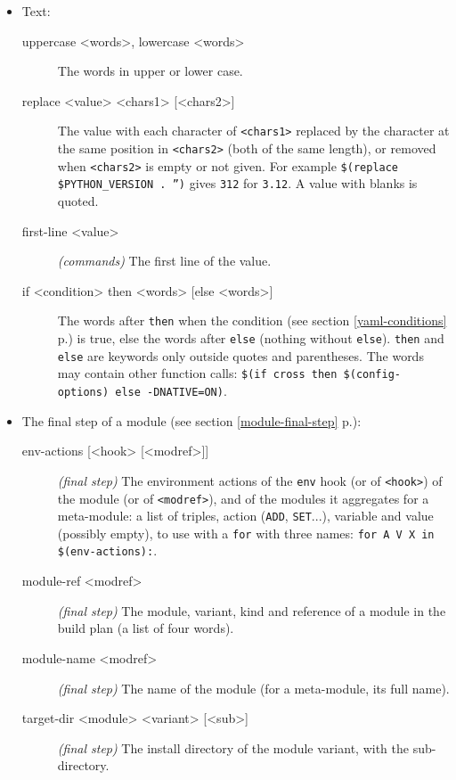 \documentclass[a4paper,12pt,twoside]{article}
\newcommand{\code}[1]{\texttt{#1}}
\renewcommand{\emph}[1]{\textit{#1}}
\newcommand{\seeref}[1]{see section \ref{#1} p.\pageref{#1}}
\begin{document}
\begin{itemize}
\item Text:

\begin{description}
	\item[uppercase <words>, lowercase <words>] The words in upper or lower
	case.
	\item[replace <value> <chars1> {[<chars2>]}] The value
	with each character of \code{<chars1>} replaced by the character at the
	same position in \code{<chars2>} (both of the same length), or removed
	when \code{<chars2>} is empty or not given. For example \code{\$(replace
	\$PYTHON\_VERSION . '')} gives \code{312} for \code{3.12}. A value with
	blanks is quoted.
	\item[first-line <value>] \emph{(commands)} The first line of the
	value.
	\item[if <condition> then <words> {[else <words>]}] 
	The words after \code{then} when the condition (\seeref{yaml-conditions})
	is true, else the words after \code{else} (nothing without \code{else}).
	\code{then} and \code{else} are keywords only outside quotes and
	parentheses. The words may contain other function calls:
	\code{\$(if cross then \$(config-options) else -DNATIVE=ON)}.
\end{description}

\item The final step of a module (\seeref{module-final-step}):

\begin{description}
	\item[env-actions {[<hook> [<modref>]]}] 
	\emph{(final step)} The environment actions of the \code{env} hook (or
	of \code{<hook>}) of the module (or of \code{<modref>}), and of the
	modules it aggregates for a meta-module: a list of triples, action
	(\code{ADD}, \code{SET}...), variable and value (possibly empty), to use
	with a \code{for} with three names: \code{for A V X in
	\$(env-actions):}.
	\item[module-ref <modref>] \emph{(final step)} The
	module, variant, kind and reference of a module in the build plan (a
	list of four words).
	\item[module-name <modref>] \emph{(final step)} The
	name of the module (for a meta-module, its full name).
	\item[target-dir <module> <variant> {[<sub>]}] 
	\emph{(final step)} The install directory of the module variant, with
	the sub-directory.
\end{description}
\end{itemize}
\end{document}
